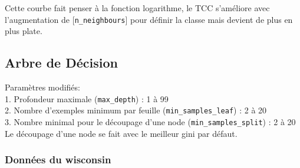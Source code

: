 \documentclass[10pt,letterpaper]{article}
\begin{document}
Cette courbe fait penser à la fonction logarithme, le TCC s’améliore avec l’augmentation de [\verb!n_neighbours!] pour définir la classe mais devient de plus en plus plate.

\subsection*{Arbre de Décision}
Paramètres modifiés:\\
1. Profondeur maximale (\verb!max_depth!) : 1 à 99\\
2. Nombre d’exemples minimum par feuille (\verb!min_samples_leaf!) : 2 à 20\\
3. Nombre minimal pour le découpage d’une node (\verb!min_samples_split!) : 2 à 20\\

\vspace{2mm}
Le découpage d’une node se fait avec le meilleur gini par défaut.
\subsubsection*{Données du wisconsin}
\end{document}
